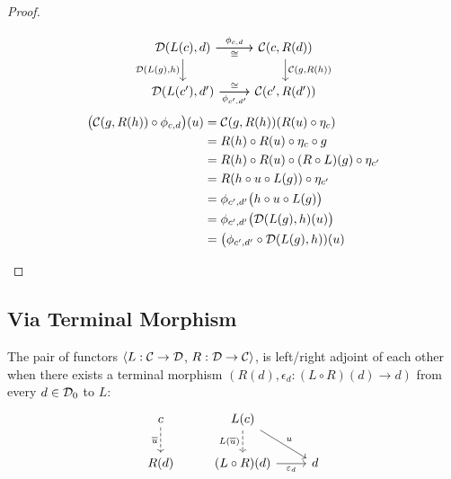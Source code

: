 \begin{theorem}
\begin{proof}
\begin{description}
        \[\begin{tikzcd}[ampersand replacement=\&]
          {\mathcal{D}(L(c), d)} \& {\mathcal{C}(c, R(d))} \\
          {\mathcal{D}(L(c'), d')} \& {\mathcal{C}(c', R(d'))}
          \arrow["{\phi_{c,d}}", from=1-1, to=1-2]
          \arrow["{\mathcal{D}(L(g),h)}"', from=1-1, to=2-1]
          \arrow["{\phi_{c',d'}}"', from=2-1, to=2-2]
          \arrow["{\mathcal{C}(g,R(h))}", from=1-2, to=2-2]
          \arrow["\cong"', from=1-1, to=1-2]
          \arrow["\cong", from=2-1, to=2-2]
        \end{tikzcd}\]
        \[
          \begin{aligned}
            \big(\mathcal{C}(g, R(h))\circ \phi_{c,d}\big)(u)
            &= \mathcal{C}(g, R(h))(R(u)\circ\eta_c)\\
            &= R(h)\circ R(u)\circ\eta_c \circ g\\
            &= R(h)\circ R(u) \circ (R\circ L)(g)\circ \eta_{c'}\\
            &= R(h\circ u\circ L(g))\circ \eta_{c'}\\
            &= \phi_{c', d'}\big(h\circ u \circ L(g)\big)\\
            &= \phi_{c', d'}\big(\mathcal{D}(L(g), h)(u)\big)\\
            &= \big(\phi_{c', d'}\circ \mathcal{D}(L(g), h))(u)
          \end{aligned}
        \]
    \end{description}
  \end{proof}
\end{theorem}

\subsection{Via Terminal Morphism}

\begin{definition}
  The pair of functors $\langle L: \mathcal{C}\to \mathcal{D}$, $R: \mathcal{D}\to \mathcal{C}\rangle$, is left/right adjoint
  of each other when there exists a terminal morphism $(R(d), \epsilon_d:
  (L\circ R)(d) \to d)$ from every $d\in \mathcal{D}_0$ to $L$:
  \parencite{awodey:category_theory}
  \[\begin{tikzcd}[ampersand replacement=\&]
    c \& {L(c)} \\
    {R(d)} \& {(L\circ R)(d)} \& d
    \arrow["{\overline{u}}"', dashed, from=1-1, to=2-1]
    \arrow["{L(\overline{u})}"', dashed, from=1-2, to=2-2]
    \arrow["{\varepsilon_d}"', from=2-2, to=2-3]
    \arrow["u", from=1-2, to=2-3]
  \end{tikzcd}\]
\end{definition}

